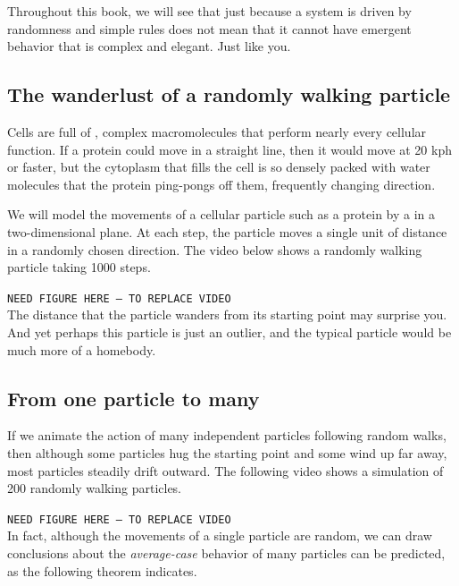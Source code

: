 Throughout this book, we will see that just because a system is driven by randomness and simple rules does not mean that it cannot have emergent behavior that is complex and elegant. Just like you.

\FloatBarrier
{}
\subsection{The wanderlust of a randomly walking particle}

Cells are full of , complex macromolecules that perform nearly every cellular function. If a protein could move in a straight line, then it would move at 20 kph or faster, but the cytoplasm that fills the cell is so densely packed with water molecules that the protein ping-pongs off them, frequently changing direction.

We will model the movements of a cellular particle such as a protein by a  in a two-dimensional plane. At each step, the particle moves a single unit of distance in a randomly chosen direction. The video below shows a randomly walking particle taking 1000 steps.

\texttt{NEED FIGURE HERE -- TO REPLACE VIDEO}\\

The distance that the particle wanders from its starting point may surprise you. And yet perhaps this particle is just an outlier, and the typical particle would be much more of a homebody.

\FloatBarrier
{}
\subsection{From one particle to many}

If we animate the action of many independent particles following random walks, then although some particles hug the starting point and some wind up far away, most particles steadily drift outward. The following video shows a simulation of 200 randomly walking particles.

\texttt{NEED FIGURE HERE -- TO REPLACE VIDEO}\\

In fact, although the movements of a single particle are random, we can draw conclusions about the \textit{average-case} behavior of many particles can be predicted, as the following theorem indicates.


